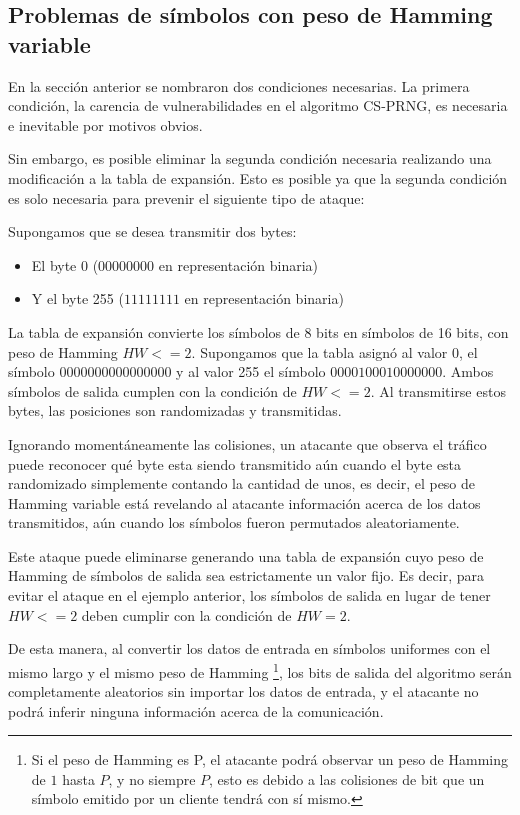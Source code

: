 \subsection{Problemas de símbolos con peso de Hamming variable}
En la sección anterior se nombraron dos condiciones necesarias. La primera condición, la carencia de vulnerabilidades en el algoritmo CS-PRNG, es necesaria e inevitable por motivos obvios.

Sin embargo, es posible eliminar la segunda condición necesaria realizando una modificación a la tabla de expansión. Esto es posible ya que la segunda condición es solo necesaria para prevenir el siguiente tipo de ataque:

Supongamos que se desea transmitir dos bytes:
\begin{itemize}
 \item El byte 0 ($00000000$ en representación binaria) 
 \item Y el byte 255 ($11111111$ en representación binaria)
 \end{itemize}

La tabla de expansión convierte los símbolos de 8 bits en símbolos de 16 bits, con peso de Hamming $HW<=2$.
Supongamos que la tabla asignó al valor 0, el símbolo $0000000000000000$ y al valor 255 el símbolo $0000100010000000$. Ambos símbolos de salida cumplen con la condición de $HW<=2$. Al transmitirse estos bytes, las posiciones son randomizadas y transmitidas.

Ignorando momentáneamente las colisiones, un atacante que observa el tráfico puede reconocer qué byte esta siendo transmitido aún cuando el byte esta randomizado simplemente contando la cantidad de unos, es decir, el peso de Hamming variable está revelando al atacante información acerca de los datos transmitidos, aún cuando los símbolos fueron permutados aleatoriamente.

Este ataque puede eliminarse generando una tabla de expansión cuyo peso de Hamming de símbolos de salida sea estrictamente un valor fijo. Es decir, para evitar el ataque en el ejemplo anterior, los símbolos de salida en lugar de tener $HW<=2$ deben cumplir con la condición de $HW=2$. 

De esta manera, al convertir los datos de entrada en símbolos uniformes con el mismo largo y el mismo peso de Hamming \footnote{Si el peso de Hamming es P, el atacante podrá observar un peso de Hamming de $1$ hasta $P$, y no siempre $P$, esto es debido a las colisiones de bit que un símbolo emitido por un cliente tendrá con sí mismo.}, los bits de salida del algoritmo serán completamente aleatorios sin importar los datos de entrada, y el atacante no podrá inferir ninguna información acerca de la comunicación.

